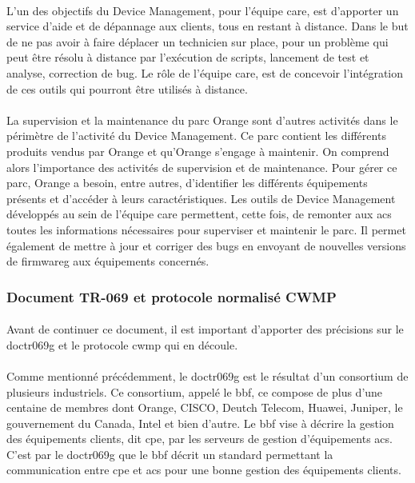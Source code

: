 \documentclass[12pt,a4paper]{report}
\begin{document}
\paragraph*{}
L’un des objectifs du Device Management, pour l’équipe \gls{care}, est d’apporter un service d’aide et de dépannage aux clients, tous en restant à distance. Dans le but de ne pas avoir à faire déplacer un technicien sur place, pour un problème qui peut être résolu à distance par l’exécution de scripts, lancement de test et analyse, correction de bug. Le rôle de l’équipe \gls{care}, est de concevoir l’intégration de ces outils qui pourront être utilisés à distance.
\paragraph*{}
La supervision et la maintenance du parc Orange sont d'autres activités dans le
périmètre de l'activité du Device Management. Ce parc contient les différents produits vendus par Orange et qu’Orange s'engage à maintenir. On comprend alors l'importance des activités de supervision et de maintenance. Pour gérer ce parc, Orange a besoin, entre autres, d'identifier les différents équipements présents et d'accéder à leurs  caractéristiques. Les outils de Device Management  développés au sein de l'équipe \gls{care} permettent, cette fois, de remonter aux \gls{acs} toutes les informations nécessaires pour superviser et maintenir le parc. Il permet également de mettre à jour et corriger des bugs en envoyant de nouvelles versions de \gls{firmwareg} aux équipements concernés. \\

\subsubsection{Document TR-069 et protocole normalisé CWMP}
\paragraph*{} Avant de continuer ce document, il est important d'apporter des précisions sur le \gls{doctr069g} et le protocole \gls{cwmp} qui en découle. 
\paragraph*{}Comme mentionné précédemment, le \gls{doctr069g} est le résultat d'un consortium de plusieurs industriels. Ce consortium, appelé le \gls{bbf}, ce compose de plus d'une centaine de membres dont Orange, CISCO, Deutch Telecom, Huawei, Juniper, le gouvernement du Canada, Intel et bien d'autre. Le \gls{bbf} vise à décrire la gestion des équipements clients, dit \gls{cpe}, par les serveurs de gestion d'équipements \gls{acs}. C'est par le \gls{doctr069g} que le \gls{bbf} décrit un standard permettant la communication entre \gls{cpe} et \gls{acs} pour une bonne gestion des équipements clients.
\end{document}
